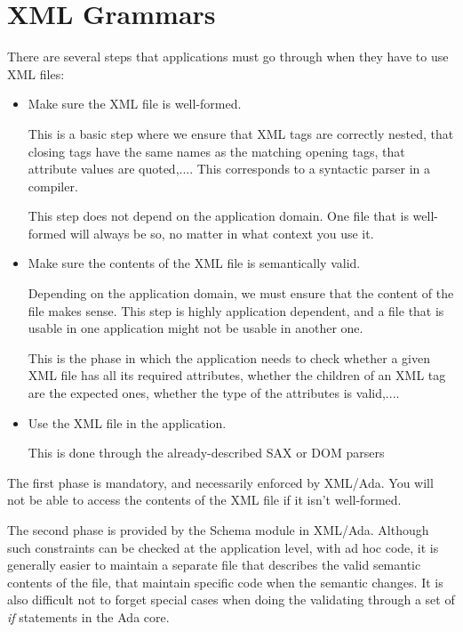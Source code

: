 \documentclass[letterpaper,10pt,english]{sphinxmanual}
\begin{document}
\section{XML Grammars}
\label{schema:xml-grammars}
There are several steps that applications must go through when they have to use
XML files:
\begin{itemize}
\item {} 
Make sure the XML file is well-formed.

This is a basic step where we ensure that XML tags are correctly nested, that
closing tags have the same names as the matching opening tags, that attribute
values are quoted,.... This corresponds to a syntactic parser in a compiler.

This step does not depend on the application domain. One file that is
well-formed will always be so, no matter in what context you use it.

\item {} 
Make sure the contents of the XML file is semantically valid.

Depending on the application domain, we must ensure that the content of the
file makes sense. This step is highly application dependent, and a file that
is usable in one application might not be usable in another one.

This is the phase in which the application needs to check whether a given XML
file has all its required attributes, whether the children of an XML tag are
the expected ones, whether the type of the attributes is valid,....

\item {} 
Use the XML file in the application.

This is done through the already-described SAX or DOM parsers

\end{itemize}

The first phase is mandatory, and necessarily enforced by XML/Ada. You will not
be able to access the contents of the XML file if it isn't well-formed.

The second phase is provided by the Schema module in XML/Ada. Although such
constraints can be checked at the application level, with ad hoc code, it is
generally easier to maintain a separate file that describes the valid semantic
contents of the file, that maintain specific code when the semantic changes. It
is also difficult not to forget special cases when doing the validating through
a set of \emph{if} statements in the Ada core.
\end{document}
